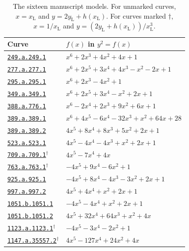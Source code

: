 \begin{table}[htbp]
\centering\scriptsize
\setlength{\tabcolsep}{3pt}
\renewcommand{\arraystretch}{1.3}
\begin{tabular}{@{}ll@{}}
\toprule
Curve & $f(x)$ in $y^2=f(x)$ \\
\midrule
\href{https://www.lmfdb.org/Genus2Curve/Q/249/a/249/1}{\texttt{249.a.249.1}} & $x^{6} + 2x^{3} + 4x^{2} + 4x + 1$ \\
\href{https://www.lmfdb.org/Genus2Curve/Q/277/a/277/1}{\texttt{277.a.277.1}} & $x^{6} + 2x^{5} + 3x^{4} + 4x^{3} - x^{2} - 2x + 1$ \\
\href{https://www.lmfdb.org/Genus2Curve/Q/295/a/295/1}{\texttt{295.a.295.1}} & $x^{6} + 2x^{3} - 4x^{2} + 1$ \\
\href{https://www.lmfdb.org/Genus2Curve/Q/349/a/349/1}{\texttt{349.a.349.1}} & $x^{6} + 2x^{5} + 3x^{4} - x^{2} + 2x + 1$ \\
\href{https://www.lmfdb.org/Genus2Curve/Q/388/a/776/1}{\texttt{388.a.776.1}} & $x^{6} - 2x^{4} + 2x^{3} + 9x^{2} + 6x + 1$ \\
\href{https://www.lmfdb.org/Genus2Curve/Q/389/a/389/1}{\texttt{389.a.389.1}} & $x^{6} + 4x^{5} - 6x^{4} - 32x^{3} + x^{2} + 64x + 28$ \\
\href{https://www.lmfdb.org/Genus2Curve/Q/389/a/389/2}{\texttt{389.a.389.2}} & $4 x^{5} + 8 x^{4} + 8 x^{3} + 5 x^{2} + 2 x + 1$ \\
\href{https://www.lmfdb.org/Genus2Curve/Q/523/a/523/1}{\texttt{523.a.523.1}} & $4 x^{5} - 4 x^{4} - 4 x^{3} + x^{2} + 2 x + 1$ \\
\href{https://www.lmfdb.org/Genus2Curve/Q/709/a/709/1}{\texttt{709.a.709.1}}$^{\dagger}$ & $4 x^{5} - 7 x^{4} + 4 x$ \\
\href{https://www.lmfdb.org/Genus2Curve/Q/763/a/763/1}{\texttt{763.a.763.1}}$^{\dagger}$ & $-4 x^{5} + 9 x^{4} - 6 x^{2} + 1$ \\
\href{https://www.lmfdb.org/Genus2Curve/Q/925/a/925/1}{\texttt{925.a.925.1}} & $-4 x^{5} + 8 x^{4} - 4 x^{3} - 3 x^{2} + 2 x + 1$ \\
\href{https://www.lmfdb.org/Genus2Curve/Q/997/a/997/2}{\texttt{997.a.997.2}} & $4 x^{5} + 4 x^{4} + x^{2} + 2 x + 1$ \\
\href{https://www.lmfdb.org/Genus2Curve/Q/1051/b/1051/1}{\texttt{1051.b.1051.1}} & $-4 x^{5} - 4 x^{4} + x^{2} + 2 x + 1$ \\
\href{https://www.lmfdb.org/Genus2Curve/Q/1051/b/1051/2}{\texttt{1051.b.1051.2}} & $4 x^{5} + 32 x^{4} + 64 x^{3} + x^{2} + 4 x$ \\
\href{https://www.lmfdb.org/Genus2Curve/Q/1123/a/1123/1}{\texttt{1123.a.1123.1}}$^{\dagger}$ & $-4 x^{5} - 3 x^{4} - 2 x^{2} + 1$ \\
\href{https://www.lmfdb.org/Genus2Curve/Q/1147/a/35557/2}{\texttt{1147.a.35557.2}}$^{\dagger}$ & $4 x^{5} - 127 x^{4} + 24 x^{2} + 4 x$ \\
\bottomrule\end{tabular}
\caption{The sixteen manuscript models. For unmarked curves, $x=x_{\mathrm L}$ and $y=2y_{\mathrm L}+h(x_{\mathrm L})$. For curves marked $\dagger$, $x=1/x_{\mathrm L}$ and $y=(2y_{\mathrm L}+h(x_{\mathrm L}))/x_{\mathrm L}^3$.}
\label{tab:curve-models}
\end{table}


